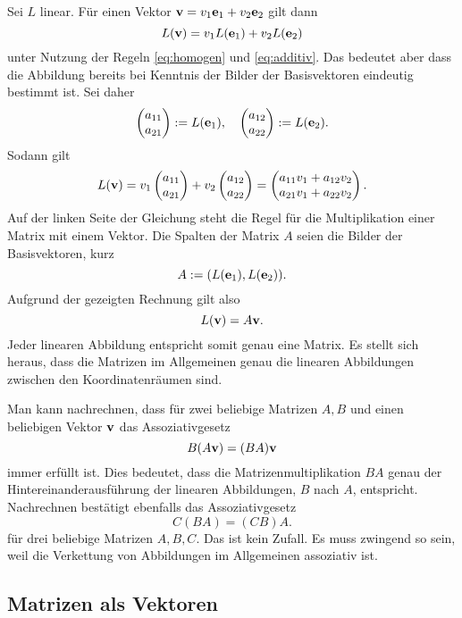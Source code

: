 Sei $L$ linear. Für einen Vektor $\mathbf{v} = v_1\mathbf{e}_1+v_2\mathbf{e}_2$
gilt dann%
\[L(\mathbf{v}) = v_1 L(\mathbf{e}_1) + v_2 L(\mathbf{e}_2)\]
unter Nutzung der Regeln \eqref{eq:homogen} und \eqref{eq:additiv}.
Das bedeutet aber dass die Abbildung bereits bei Kenntnis der
Bilder der Basisvektoren eindeutig bestimmt ist. Sei daher%
\[\begin{pmatrix}a_{11}\\ a_{21}\end{pmatrix} := L(\mathbf{e}_1),
\quad \begin{pmatrix}a_{12}\\ a_{22}\end{pmatrix} := L(\mathbf{e}_2).\]
Sodann gilt
\[L(\mathbf{v}) = v_1\begin{pmatrix}a_{11}\\ a_{21}\end{pmatrix}
+ v_2\begin{pmatrix}a_{12}\\ a_{22}\end{pmatrix}
= \begin{pmatrix}a_{11}v_1+a_{12}v_2\\ a_{21}v_1+a_{22}v_2\end{pmatrix}.\]
Auf der linken Seite der Gleichung steht die Regel für die
Multiplikation einer Matrix mit einem Vektor.
Die Spalten der Matrix $A$ seien die Bilder der Basisvektoren, kurz
\[A := (L(\mathbf{e}_1),L(\mathbf{e}_2)).\]
Aufgrund der gezeigten Rechnung gilt also%
\[L(\mathbf{v}) = A\mathbf{v}.\]
Jeder linearen Abbildung entspricht somit genau eine Matrix. Es stellt
sich heraus, dass die Matrizen im Allgemeinen genau die linearen
Abbildungen zwischen den Koordinatenräumen sind.

Man kann nachrechnen, dass für zwei beliebige Matrizen $A,B$ und
einen beliebigen Vektor $\mathbf{v}$ das Assoziativgesetz%
\[B(A\mathbf{v}) = (BA)\mathbf{v}\]
immer erfüllt ist. Dies bedeutet, dass die Matrizenmultiplikation
$BA$ genau der Hintereinanderausführung der linearen Abbildungen,
$B$ nach $A$, entspricht. Nachrechnen bestätigt ebenfalls das
Assoziativgesetz%
\[C(BA) = (CB)A.\]
für drei beliebige Matrizen $A,B,C$. Das ist kein Zufall. Es muss
zwingend so sein, weil die Verkettung von Abbildungen im Allgemeinen
assoziativ ist.

\subsection{Matrizen als Vektoren}

